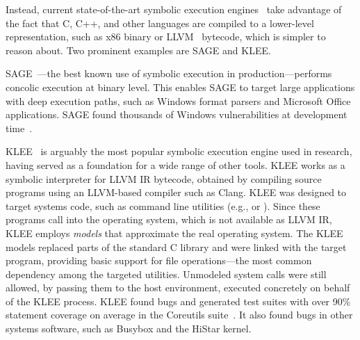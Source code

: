 Instead, current state-of-the-art symbolic execution engines~\cite{godefroid:fuzz,klee,bitBlaze,s2eSystem,mayhem} take advantage of the fact that C, C++, and other languages are compiled to a lower-level representation, such as x86 binary or LLVM~\cite{llvm} bytecode, which is simpler to reason about.  Two prominent examples are SAGE and KLEE.

SAGE~\cite{sage2012,godefroid:fuzz}---the best known use of symbolic execution in production---performs concolic execution at binary level.
%
This enables SAGE to target large applications with deep execution paths, such as Windows format parsers and Microsoft Office applications.
%
SAGE found thousands of Windows vulnerabilities at development time~\cite{sage2012,Godefroid:2012}.


KLEE~\cite{klee} is arguably the most popular symbolic execution engine used in research, having served as a foundation for a wide range of other tools.
%
KLEE works as a symbolic interpreter for LLVM IR bytecode, obtained by compiling source programs using an LLVM-based compiler such as Clang.
%
KLEE was designed to target systems code, such as command line utilities (e.g.,  or ).  Since these programs call into the operating system, which is not available as LLVM IR, KLEE employs \emph{models} that approximate the real operating system.
%
The KLEE models replaced parts of the standard C library and were linked with the target program, providing basic support for file operations---the most common dependency among the targeted utilities.
%
Unmodeled system calls were still allowed, by passing them to the host environment, executed concretely on behalf of the KLEE process.
%
KLEE found bugs and generated test suites with over 90\% statement coverage on average in the Coreutils suite~\cite{klee}.  It also found bugs in other systems software, such as Busybox and the HiStar kernel.

